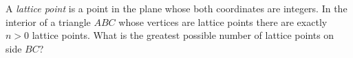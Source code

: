 \problem{}
A \emph{lattice point} is a point in the plane whose both coordinates are integers.
In the interior of a triangle $ABC$ whose vertices are lattice points there are exactly
$n > 0$ lattice points.
What is the greatest possible number of lattice points on side $BC$?
\solution
\endproblem
